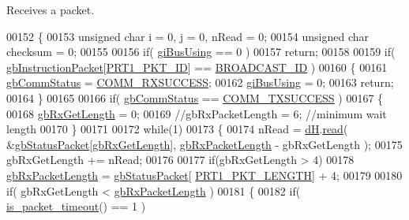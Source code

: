 Receives a packet. 


\begin{DoxyCode}
00152 \{
00153     \textcolor{keywordtype}{unsigned} \textcolor{keywordtype}{char} i = 0, j = 0, nRead = 0;
00154     \textcolor{keywordtype}{unsigned} \textcolor{keywordtype}{char} checksum = 0;
00155 
00156     \textcolor{keywordflow}{if}( \hyperlink{classdynamixel_ad10e0e49f5fef04bf789a89c14cc470a}{giBusUsing} == 0 )
00157         \textcolor{keywordflow}{return};
00158 
00159     \textcolor{keywordflow}{if}( \hyperlink{classdynamixel_afd94dcf01b8e96298727776e222de722}{gbInstructionPacket}[\hyperlink{dynamixel_8h_a3c2bb339c587abadd977eb2f14daeff9}{PRT1\_PKT\_ID}] == 
      \hyperlink{dynamixel_8h_ab9fe47395310b34fa1ceb112c9ca10e2}{BROADCAST\_ID} )
00160     \{
00161         \hyperlink{classdynamixel_a5b603f6bed7ccc595f1f50bd6a6ebbfc}{gbCommStatus} = \hyperlink{dynamixel_8h_a171328d9f298535c18d079f65e631434}{COMM\_RXSUCCESS};
00162         \hyperlink{classdynamixel_ad10e0e49f5fef04bf789a89c14cc470a}{giBusUsing} = 0;
00163         \textcolor{keywordflow}{return};
00164     \}
00165     
00166     \textcolor{keywordflow}{if}( \hyperlink{classdynamixel_a5b603f6bed7ccc595f1f50bd6a6ebbfc}{gbCommStatus} == \hyperlink{dynamixel_8h_aac6d30f996256b24d311de81eb0f0c1e}{COMM\_TXSUCCESS} )
00167     \{
00168         \hyperlink{classdynamixel_a9d590ce24791d111c2db9b66be1e046d}{gbRxGetLength} = 0;
00169         \textcolor{comment}{//gbRxPacketLength = 6; //minimum wait length}
00170     \}
00171     
00172     \textcolor{keywordflow}{while}(1)
00173     \{
00174         nRead = \hyperlink{classdynamixel_ae003cc90ada6d7b70eaa4ea9d42d4deb}{dH}.\hyperlink{classdxl__hal_ac36331febb2eaa66303af3483795742a}{read}( &\hyperlink{classdynamixel_aa57c86d3bbbeaf5c9d4f6bd00376b04f}{gbStatusPacket}[\hyperlink{classdynamixel_a9d590ce24791d111c2db9b66be1e046d}{gbRxGetLength}], 
      \hyperlink{classdynamixel_a333686e1b5903d16c41df8172b6bd5a8}{gbRxPacketLength} - gbRxGetLength );
00175         gbRxGetLength += nRead;
00176 
00177         \textcolor{keywordflow}{if}(gbRxGetLength > 4)
00178             \hyperlink{classdynamixel_a333686e1b5903d16c41df8172b6bd5a8}{gbRxPacketLength} = \hyperlink{classdynamixel_aa57c86d3bbbeaf5c9d4f6bd00376b04f}{gbStatusPacket}[
      \hyperlink{dynamixel_8h_ab24601f91d0364e4b62edad3c2a0a5c4}{PRT1\_PKT\_LENGTH}] + 4;
00179 
00180         \textcolor{keywordflow}{if}( gbRxGetLength < \hyperlink{classdynamixel_a333686e1b5903d16c41df8172b6bd5a8}{gbRxPacketLength} )
00181         \{
00182             \textcolor{keywordflow}{if}( \hyperlink{classdynamixel_a00d08481ebc4dee19debecf43f888522}{is\_packet\_timeout}() == 1 )

\end{DoxyCode}
